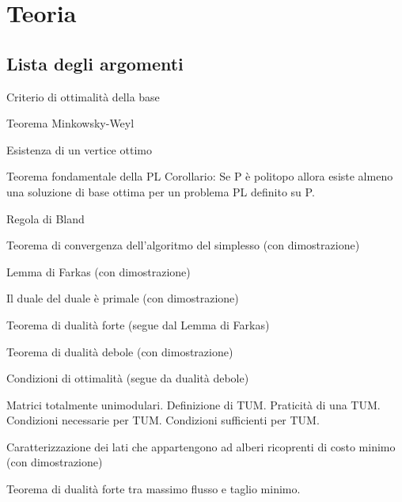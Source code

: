 \documentclass[\main/main.tex]{subfiles}
\begin{document}
\chapter{Teoria}

\section*{Lista degli argomenti}
\begin{todolist}
  \item Criterio di ottimalità della base
  \item Teorema Minkowsky-Weyl
  \item Esistenza di un vertice ottimo
  \item Teorema fondamentale della PL
  \subitem Corollario: Se P è politopo allora esiste almeno una soluzione di base ottima per un problema PL definito su P.
  \item Regola di Bland
  \item Teorema di convergenza dell'algoritmo del simplesso (con dimostrazione)
  \item Lemma di Farkas (con dimostrazione)
  \item Il duale del duale è primale (con dimostrazione)
  \item Teorema di dualità forte (segue dal Lemma di Farkas)
  \item Teorema di dualità debole (con dimostrazione)
  \item Condizioni di ottimalità (segue da dualità debole)
  \item Matrici totalmente unimodulari.
  \subitem Definizione di TUM.
  \subitem Praticità di una TUM.
  \subitem Condizioni necessarie per TUM.
  \subitem Condizioni sufficienti per TUM.
  \item Caratterizzazione dei lati che appartengono ad alberi ricoprenti di costo minimo (con dimostrazione)
  \item Teorema di dualità forte tra massimo flusso e taglio minimo.
\end{todolist}

\clearpage




\clearpage

\clearpage


\clearpage





\clearpage

\clearpage


\end{document}
